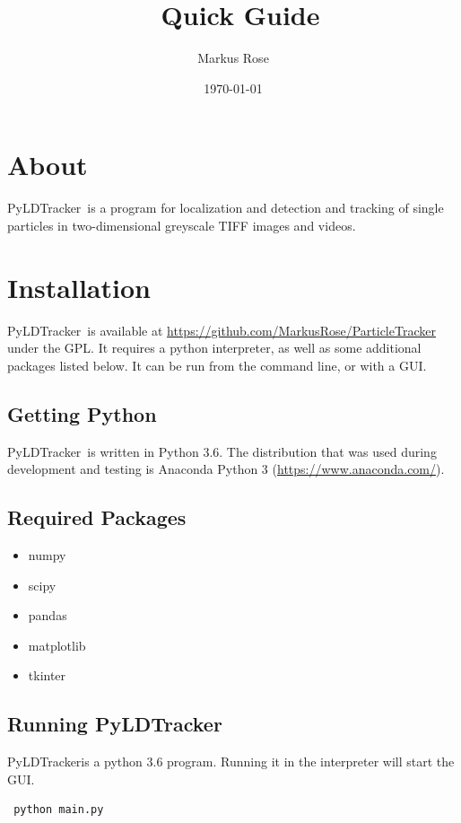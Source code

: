 \documentclass[oneside,letterpaper]{scrartcl}
\author{Markus Rose}
\title{\PN\ Quick Guide}
\date{\today}
\newcommand{\PN}{PyLDTracker}
\begin{document}
\maketitle

\tableofcontents

\section{About}
\PN\ is a program for localization and detection and tracking of single particles in two-dimensional greyscale TIFF images and videos.

\section{Installation}

\PN\ is available at \url{https://github.com/MarkusRose/ParticleTracker} under the GPL. It requires a python interpreter, as well as some additional packages listed below. It can be run from the command line, or with a GUI.

\subsection{Getting Python}

\PN\ is written in Python 3.6. The distribution that was used during development and testing is 
Anaconda Python 3 (\url{https://www.anaconda.com/}).


\subsection{Required Packages}

\begin{itemize}
\item numpy
\item scipy
\item pandas
\item matplotlib
\item tkinter
\end{itemize}


\subsection{Running \PN}

\PN is a python 3.6 program. Running it in the interpreter will start the GUI.

\begin{verbatim} python main.py \end{verbatim}
\end{document}
